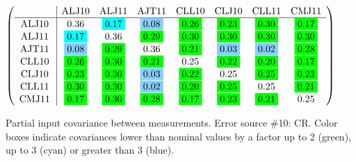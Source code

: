 \begin{table}[H]
\scriptsize
\begin{center}
\renewcommand{\arraystretch}{1.1}
\begin{math}\left(\begin{array}{c|ccccccc}
 & \mathrm{ALJ10} & 
\mathrm{ALJ11} & 
\mathrm{AJT11} & 
\mathrm{CLL10} & 
\mathrm{CLJ10} & 
\mathrm{CLL11} & 
\mathrm{CMJ11} \\
\hline
\mathrm{ALJ10} \hspace*{2pt} &       0.36 &  \colorbox{Cyan1}{$      0.17$} &  \colorbox{SkyBlue1}{$      0.08$} &  \colorbox{Green1}{$      0.26$} &  \colorbox{Green1}{$      0.23$} &  \colorbox{Green1}{$      0.30$} &  \colorbox{Green1}{$      0.17$} \\
\mathrm{ALJ11} \hspace*{2pt} &  \colorbox{Cyan1}{$      0.17$} &       0.36 &  \colorbox{Green1}{$      0.29$} &  \colorbox{Green1}{$      0.30$} &  \colorbox{Green1}{$      0.30$} &  \colorbox{Green1}{$      0.30$} &  \colorbox{Green1}{$      0.30$} \\
\mathrm{AJT11} \hspace*{2pt} &  \colorbox{SkyBlue1}{$      0.08$} &  \colorbox{Green1}{$      0.29$} &       0.36 &  \colorbox{Green1}{$      0.21$} &  \colorbox{SkyBlue1}{$      0.03$} &  \colorbox{SkyBlue1}{$      0.02$} &  \colorbox{Green1}{$      0.28$} \\
\mathrm{CLL10} \hspace*{2pt} &  \colorbox{Green1}{$      0.26$} &  \colorbox{Green1}{$      0.30$} &  \colorbox{Green1}{$      0.21$} &       0.25 &  \colorbox{Green1}{$      0.22$} &  \colorbox{Green1}{$      0.20$} &  \colorbox{Green1}{$      0.17$} \\
\mathrm{CLJ10} \hspace*{2pt} &  \colorbox{Green1}{$      0.23$} &  \colorbox{Green1}{$      0.30$} &  \colorbox{SkyBlue1}{$      0.03$} &  \colorbox{Green1}{$      0.22$} &       0.25 &  \colorbox{Green1}{$      0.25$} &  \colorbox{Green1}{$      0.23$} \\
\mathrm{CLL11} \hspace*{2pt} &  \colorbox{Green1}{$      0.30$} &  \colorbox{Green1}{$      0.30$} &  \colorbox{SkyBlue1}{$      0.02$} &  \colorbox{Green1}{$      0.20$} &  \colorbox{Green1}{$      0.25$} &       0.25 &  \colorbox{Green1}{$      0.21$} \\
\mathrm{CMJ11} \hspace*{2pt} &  \colorbox{Green1}{$      0.17$} &  \colorbox{Green1}{$      0.30$} &  \colorbox{Green1}{$      0.28$} &  \colorbox{Green1}{$      0.17$} &  \colorbox{Green1}{$      0.23$} &  \colorbox{Green1}{$      0.21$} &       0.25 \\
\end{array}\right)\end{math}
\caption{Partial input covariance between measurements. Error source \#10: CR. Color boxes indicate covariances lower than nominal values by a factor up to 2 (green), up to 3 (cyan) or greater than 3 (blue).}
\renewcommand{\arraystretch}{1}
\end{center}
\end{table}
